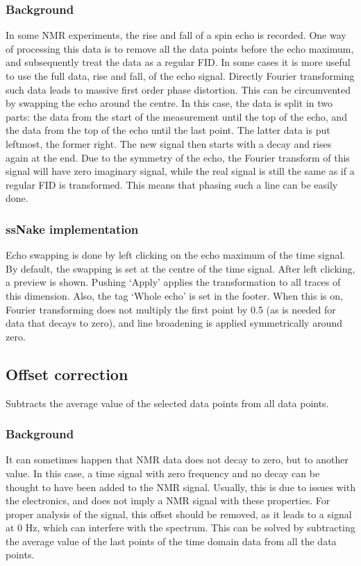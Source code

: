 \documentclass[11pt,a4paper]{article}
\begin{document}
\subsubsection*{Background}
In some NMR experiments, the rise and fall of a spin echo is recorded. One way of processing this data is to remove all the data points before the echo maximum, and subsequently treat the data as a regular FID. In some cases it is more useful to use the full data, rise and fall, of the echo signal. Directly Fourier transforming such data leads to massive first order phase distortion. This can be circumvented by swapping the echo around the centre. In this case, the data is split in two parts: the data from the start of the measurement until the top of the echo, and the data from the top of the echo until the last point. The latter data is put leftmost, the former right. The new signal then starts with a decay and rises again at the end. Due to the symmetry of the echo, the Fourier transform of this signal will have zero imaginary signal, while the real signal is still the same as if a regular FID is transformed. This means that phasing such a line can be easily done.

\subsubsection*{ssNake implementation}
Echo swapping is done by left clicking on the echo maximum of the time signal. By default, the swapping is set at the centre of the time signal. After left clicking, a preview is shown. Pushing `Apply' applies the transformation to all traces of this dimension. Also, the tag `Whole echo' is set in the footer. When this is on, Fourier transforming does not multiply the first point by 0.5 (as is needed for data that decays to zero), and line broadening is applied symmetrically around zero.


\subsection{Offset correction}
Subtracts the average value of the selected data points from all data points.

\subsubsection*{Background}
It can sometimes happen that NMR data does not decay to zero, but to another value. In this case, a time signal with zero frequency and no decay can be thought to have been added to the NMR signal. Usually, this is due to issues with the electronics, and does not imply a NMR signal with these properties. For proper analysis of the signal, this offset should be removed, as it leads to a signal at 0 Hz, which can interfere with the spectrum. This can be solved by subtracting the average value of the last points of the time domain data from all the data points.
\end{document}
